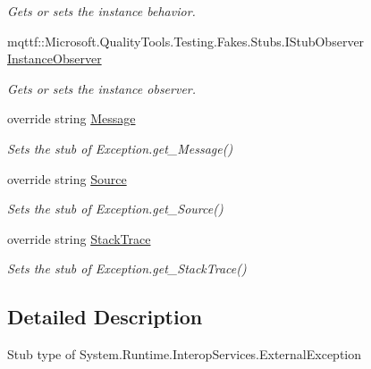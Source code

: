 \begin{DoxyCompactItemize}
\begin{DoxyCompactList}\small\item\em Gets or sets the instance behavior.\end{DoxyCompactList}\item 
mqttf\-::\-Microsoft.\-Quality\-Tools.\-Testing.\-Fakes.\-Stubs.\-I\-Stub\-Observer \hyperlink{class_system_1_1_runtime_1_1_interop_services_1_1_fakes_1_1_stub_external_exception_a64c4d72a9605359dcbbbffbb02831fa7}{Instance\-Observer}
\begin{DoxyCompactList}\small\item\em Gets or sets the instance observer.\end{DoxyCompactList}\item 
override string \hyperlink{class_system_1_1_runtime_1_1_interop_services_1_1_fakes_1_1_stub_external_exception_aa0ae2ab89b1fb642db861f8e1dd259de}{Message}
\begin{DoxyCompactList}\small\item\em Sets the stub of Exception.\-get\-\_\-\-Message()\end{DoxyCompactList}\item 
override string \hyperlink{class_system_1_1_runtime_1_1_interop_services_1_1_fakes_1_1_stub_external_exception_ac759ceb8de292faca7a54a7f5adc395d}{Source}
\begin{DoxyCompactList}\small\item\em Sets the stub of Exception.\-get\-\_\-\-Source()\end{DoxyCompactList}\item 
override string \hyperlink{class_system_1_1_runtime_1_1_interop_services_1_1_fakes_1_1_stub_external_exception_ac185a256b3fc8e2626ed9f1938b811d2}{Stack\-Trace}
\begin{DoxyCompactList}\small\item\em Sets the stub of Exception.\-get\-\_\-\-Stack\-Trace()\end{DoxyCompactList}\end{DoxyCompactItemize}


\subsection{Detailed Description}
Stub type of System.\-Runtime.\-Interop\-Services.\-External\-Exception



